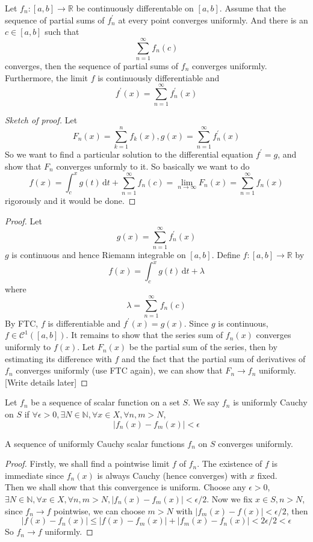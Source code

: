 \begin{theorem}
    Let $f_n:[a,b]\to\mathbb R$ be continuously differentable on $[a,b]$.
    Assume that the sequence of partial sums of $f^\prime_n$ at every point converges uniformly.
    And there is an $c\in[a,b]$ such that
    $$\sum_{n=1}^\infty f_n(c)$$
    converges, then the sequence of partial sums of $f_n$ converges uniformly.
    Furthermore, the limit $f$ is continuously differentiable and
    $$f^\prime(x)=\sum_{n=1}^\infty f^\prime_n(x)$$ 
\end{theorem}
\begin{proof}[Sketch of proof]
    Let
    $$F_n(x)=\sum_{k=1}^nf_k(x), g(x)=\sum_{n=1}^\infty f^\prime_n(x)$$
    So we want to find a particular solution to the differential equation $f^\prime=g$, and show that $F_n$ converges unformly to it.
    So basically we want to do
    $$f(x)=\int_c^x g(t)\,\mathrm dt+\sum_{n=1}^\infty f_n(c)=\lim_{n\to\infty}F_n(x)=\sum_{n=1}^\infty f_n(x)$$
    rigorously and it would be done.
\end{proof}
\begin{proof}
    Let
    $$g(x)=\sum_{n=1}^\infty f^\prime_n(x)$$
    $g$ is continuous and hence Riemann integrable on $[a,b]$.
    Define $f:[a,b]\to\mathbb R$ by 
    $$f(x)=\int_c^xg(t)\,\mathrm dt+\lambda$$
    where
    $$\lambda=\sum_{n=1}^\infty f_n(c)$$
    By FTC, $f$ is differentiable and $f^\prime(x)=g(x)$.
    Since $g$ is continuous, $f\in\mathcal C^1([a,b])$.
    It remains to show that the series sum of $f_n(x)$ converges uniformly to $f(x)$.
    Let $F_n(x)$ be the partial sum of the series, then by estimating its difference with $f$ and the fact that the partial sum of derivatives of $f_n$ converges uniformly (use FTC again), we can show that $F_n\to f_n$ uniformly.
    [Write details later]
\end{proof}
\begin{definition}
    Let $f_n$ be a sequence of scalar function on a set $S$.
    We say $f_n$ is uniformly Cauchy on $S$ if $\forall\epsilon>0,\exists N\in\mathbb N,\forall x\in X,\forall n,m>N$,
    $$|f_n(x)-f_m(x)|<\epsilon$$
\end{definition}
\begin{theorem}\label{GP_UnifConv}
    A sequence of uniformly Cauchy scalar functions $f_n$ on $S$ converges uniformly.
\end{theorem}
\begin{proof}
    Firstly, we shall find a pointwise limit $f$ of $f_n$.
    The existence of $f$ is immediate since $f_n(x)$ is always Cauchy (hence converges) with $x$ fixed.\\
    Then we shall show that this convergence is uniform.
    Choose any $\epsilon>0$, $\exists N\in\mathbb N,\forall x\in X,\forall n,m>N,|f_n(x)-f_m(x)|<\epsilon/2$.
    Now we fix $x\in S,n>N$, since $f_n\to f$ pointwise, we can choose $m>N$ with $|f_m(x)-f(x)|<\epsilon/2$, then
    $$|f(x)-f_n(x)|\le |f(x)-f_m(x)|+|f_m(x)-f_n(x)|<2\epsilon/2<\epsilon$$
    So $f_n\to f$ uniformly.
\end{proof}
